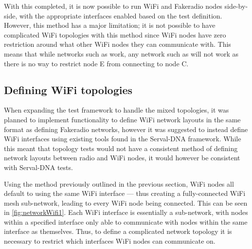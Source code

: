 With this completed, it is now possible to run WiFi and Fakeradio nodes side-by-side, with the appropriate interfaces enabled based on the test definition.
However, this method has a major limitation; it is not possible to have complicated WiFi topologies with this method since WiFi nodes have zero restriction around what other WiFi nodes they can communicate with.
This means that while networks such as  work, any network such as  will not work as there is no way to restrict node E from connecting to node C.



\subsection{Defining WiFi topologies}
When expanding the test framework to handle the mixed topologies, it was planned to implement functionality to define WiFi network layouts in the same format as defining Fakeradio networks, however it was suggested to instead define WiFi interfaces using existing tools found in the Serval-DNA framework.
While this meant that topology tests would not have a consistent method of defining network layouts between radio and WiFi nodes, it would however be consistent with Serval-DNA tests.

Using the method previously outlined in the previous section, WiFi nodes all default to using the same WiFi interface — thus creating a fully-connected WiFi mesh sub-network, leading to every WiFi node being connected. 
This can be seen in \figurename{ \ref{fig:networkWifi1}}.
Each WiFi interface is essentially a sub-network, with nodes within a specified interface only able to communicate with nodes within the same interface as themselves.
Thus, to define a complicated network topology it is necessary to restrict which interfaces WiFi nodes can communicate on.

